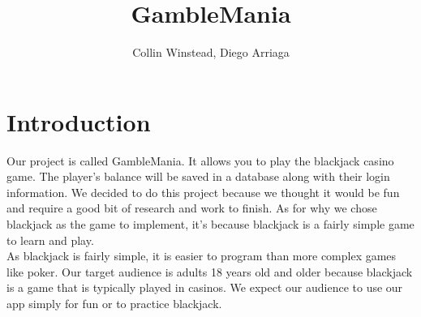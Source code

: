 \documentclass[10pt,conference,onecolumn,compsoc]{IEEEtran}
\begin{document}
\title{GambleMania}
%
%


\author{Collin Winstead, Diego Arriaga%
}



\maketitle



\IEEEdisplaynontitleabstractindextext

\IEEEpeerreviewmaketitle



\section{Introduction}


Our project is called GambleMania. It allows you to play the blackjack casino game. The player's balance will be saved in a database along with their login information. We decided to do this project because we thought it would be fun and require a good bit of research and work to finish. As for why we chose blackjack as the game to implement, it's because blackjack is a fairly simple game to learn and play.\\
\newline
As blackjack is fairly simple, it is easier to program than more complex games like poker. Our target audience is adults 18 years old and older because blackjack is a game that is typically played in casinos. We expect our audience to use our app simply for fun or to practice blackjack.\\
\end{document}
